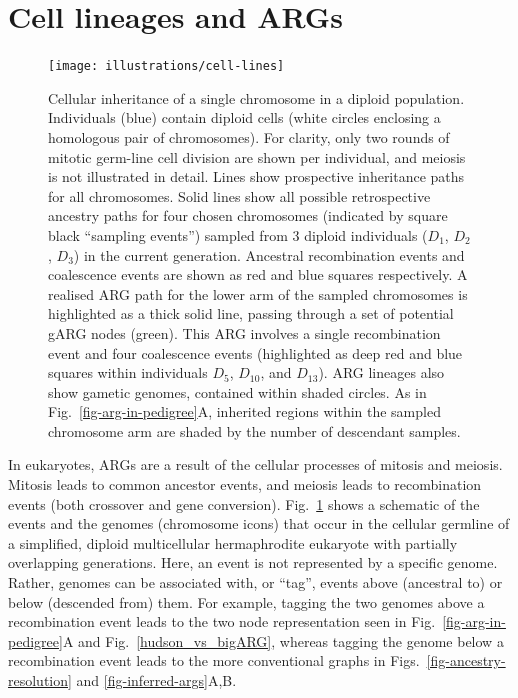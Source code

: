 \documentclass{article}
\begin{document}
\section{Cell lineages and ARGs}
\label{sec-cell-lineages-and-args}
\begin{figure}
\begin{center}
    \texttt{[image: illustrations/cell-lines]}
\end{center}
\caption{\label{fig-cell-lines}
Cellular inheritance of a single chromosome in a diploid population.
Individuals (blue) contain diploid cells (white circles enclosing a homologous pair of chromosomes).
For clarity, only two rounds of mitotic germ-line cell division are shown per individual, and
meiosis is not illustrated in detail.
Lines show prospective inheritance paths for all chromosomes. Solid lines show all possible
retrospective ancestry paths for four chosen chromosomes (indicated by square black ``sampling events'')
sampled from 3 diploid individuals ($D_1$, $D_2$, $D_3$) in the current generation.
Ancestral recombination events and coalescence events are shown as red and blue squares respectively.
A realised ARG path for the lower arm of the sampled chromosomes is highlighted as a
thick solid line, passing through a set of potential gARG nodes (green). This ARG
involves a single recombination event and four coalescence events
(highlighted as deep red and blue squares within individuals $D_5$, $D_{10}$, and $D_{13}$).
ARG lineages also show gametic genomes, contained within shaded circles.
As in Fig.~\ref{fig-arg-in-pedigree}A, inherited regions within the sampled chromosome arm are
shaded by the number of descendant samples.
}
\end{figure}

In eukaryotes, ARGs are a result of the cellular processes of mitosis and meiosis.
Mitosis leads to common ancestor events,
and meiosis leads to recombination events (both crossover and gene conversion).
Fig.~\ref{fig-cell-lines} shows a schematic of the events  and
the genomes (chromosome icons) that occur in the cellular
germline of a simplified, diploid multicellular
hermaphrodite eukaryote with partially overlapping generations.
Here, an event is not represented by a specific
genome. Rather, genomes can be associated with, or ``tag'', events above
(ancestral to) or below (descended from) them.
For example, tagging the two genomes above a recombination event leads to the
two node representation seen in
Fig.~\ref{fig-arg-in-pedigree}A and Fig.~\ref{hudson_vs_bigARG},
whereas tagging the genome
below a recombination event leads to the more
conventional graphs in Figs.~\ref{fig-ancestry-resolution} and \ref{fig-inferred-args}A,B.
\end{document}
